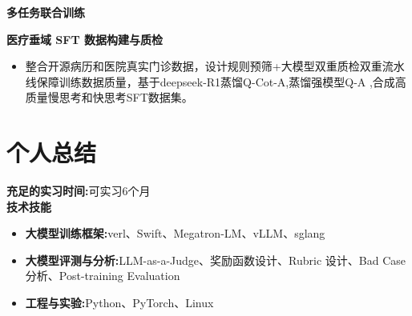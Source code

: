 \documentclass[11pt,a4paper]{article}
\begin{document}
\textbf{多任务联合训练}

\textbf{医疗垂域 SFT 数据构建与质检}
\begin{itemize}
    \item 整合开源病历和医院真实门诊数据，设计规则预筛+大模型双重质检双重流水线保障训练数据质量，基于deepseek-R1蒸馏Q-Cot-A,蒸馏强模型Q-A ,合成高质量慢思考和快思考SFT数据集。
\end{itemize}

\section{个人总结}

\textbf{充足的实习时间:}可实习6个月\\[4pt]
\textbf{技术技能}
\begin{itemize}
    \item \textbf{大模型训练框架:}verl、Swift、Megatron-LM、vLLM、sglang
    \item \textbf{大模型评测与分析:}LLM-as-a-Judge、奖励函数设计、Rubric 设计、Bad Case 分析、Post-training Evaluation
    \item \textbf{工程与实验:}Python、PyTorch、Linux
\end{itemize}
\end{document}
